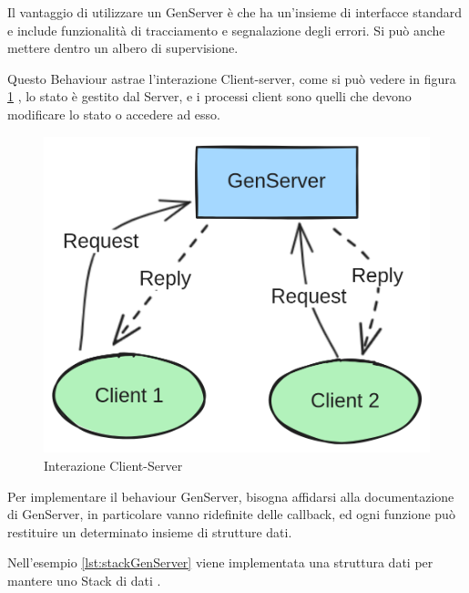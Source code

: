 Il vantaggio di utilizzare un GenServer è che ha un'insieme
di interfacce standard e include funzionalità di tracciamento
e segnalazione degli errori. Si può anche mettere dentro un
albero di supervisione.

Questo Behaviour astrae l'interazione Client-server, come si può vedere
in figura \ref{fig:client_server}  \cite{GenServe6:online},
lo stato è gestito dal Server, e i processi client sono quelli che
devono modificare lo stato o accedere ad esso.

\begin{figure}[!htp]
    \centering
    \includegraphics[keepaspectratio=true,scale=0.20]{images/GenServer.png}
	\caption{Interazione Client-Server}
  	\label{fig:client_server}
\end{figure}

Per implementare il behaviour GenServer, bisogna affidarsi alla
documentazione di GenServer, in particolare vanno ridefinite delle
callback, ed ogni funzione può restituire un determinato insieme di
strutture dati.

Nell'esempio \ref{lst:stackGenServer} viene implementata una struttura dati
per mantere uno Stack di dati \cite{GenServe6:online}.

\newpage

